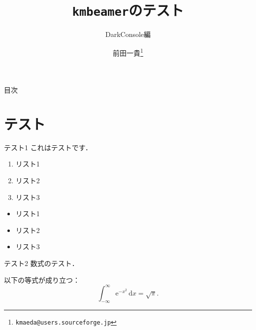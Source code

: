 \documentclass{beamer}
\title{\texttt{kmbeamer}のテスト}
\subtitle{DarkConsole編}
\author{前田一貴\footnote{\texttt{kmaeda@users.sourceforge.jp}}}
\begin{document}
\begin{frame}
  \maketitle
\end{frame}

\begin{frame}{目次}
  \tableofcontents
\end{frame}

\section{テスト}

\begin{frame}{テスト1}
  これはテストです．

  \pause

  \begin{enumerate}
  \item リスト1\pause
  \item リスト2\pause
  \item リスト3
  \end{enumerate}

  \pause

  \begin{itemize}
  \item リスト1\pause
  \item リスト2\pause
  \item リスト3
  \end{itemize}
\end{frame}

\begin{frame}{テスト2}
  数式のテスト．

  \begin{theorem}[Gauss積分]
    以下の等式が成り立つ：
    \begin{equation}
      \int_{-\infty}^\infty \mathrm{e}^{-x^2}\,\mathrm{d}x=\sqrt{\pi}.
    \end{equation}
  \end{theorem}
\end{frame}
\end{document}
